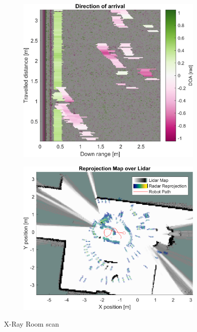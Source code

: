 \begin{figure}[htbp]
\begin{subfigure}[t]{0.475\linewidth}
    \end{subfigure}\bigskip\\
    \begin{subfigure}[t]{0.475\linewidth}  
        \centering 
        \includegraphics[width=\linewidth,max height=.475\textheight]{gfx/results/xrayroom_doa.png}
    \end{subfigure}%
    \hfill%
    \begin{subfigure}[t]{0.475\linewidth}   
        \centering 
        \includegraphics[width=\linewidth,max height=.475\textheight]{gfx/results/xrayroom_map.png}
    \end{subfigure}%
    \caption{X-Ray Room scan}
\end{figure}

